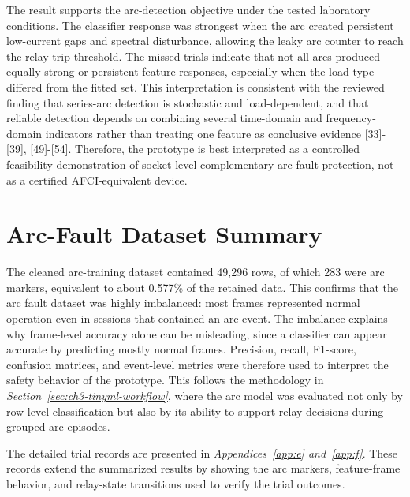 The result supports the arc-detection objective under the tested laboratory
conditions. The classifier response was strongest when the arc created
persistent low-current gaps and spectral disturbance, allowing the leaky arc
counter to reach the relay-trip threshold. The missed trials indicate that not
all arcs produced equally strong or persistent feature responses, especially
when the load type differed from the fitted set. This interpretation is
consistent with the reviewed finding that series-arc detection is stochastic
and load-dependent, and that reliable detection depends on combining several
time-domain and frequency-domain indicators rather than treating one feature as
conclusive evidence [33]-[39], [49]-[54]. Therefore, the prototype is best
interpreted as a controlled feasibility demonstration of socket-level
complementary arc-fault protection, not as a certified AFCI-equivalent device.

\section{Arc-Fault Dataset Summary}
\label{sec:ch4-arc-dataset-summary}

The cleaned arc-training dataset contained 49,296 rows, of which 283 were arc
markers, equivalent to about 0.577\% of the retained data. This confirms that
the arc fault dataset was highly imbalanced: most frames represented normal operation
even in sessions that contained an arc event. The imbalance explains why
frame-level accuracy alone can be misleading, since a classifier can appear
accurate by predicting mostly normal frames. Precision, recall, F1-score,
confusion matrices, and event-level metrics were therefore used to interpret
the safety behavior of the prototype. This follows the methodology in
\textit{Section~\ref{sec:ch3-tinyml-workflow}}, where the arc model was
evaluated not only by row-level classification but also by its ability to
support relay decisions during grouped arc episodes.

The detailed trial records are presented in \textit{Appendices~\ref{app:e}
and~\ref{app:f}}. These records extend the summarized results by showing the
arc markers, feature-frame behavior, and relay-state transitions used to verify
the trial outcomes.